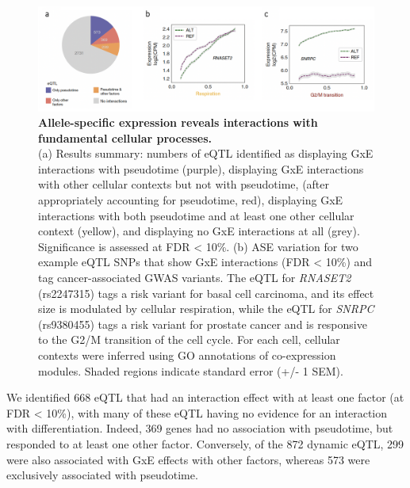 \begin{figure}[h]
\centering
\includegraphics[width=15.5cm]{Chapter4/Fig/endodiff_GxE.png}
\caption[Allele-specific expression reveals interactions with fundamental cellular processes]{\textbf{Allele-specific expression reveals interactions with fundamental cellular processes.}\\
(a) Results summary: numbers of eQTL identified as displaying GxE interactions with pseudotime (purple), displaying GxE interactions with other cellular contexts but not with pseudotime, (after appropriately accounting for pseudotime, red), displaying GxE interactions with both pseudotime and at least one other cellular context (yellow), and displaying no GxE interactions at all (grey). 
Significance is assessed at FDR < 10\%.
(b) ASE variation for two example eQTL SNPs that show GxE interactions (FDR < 10\%) and tag cancer-associated GWAS variants. 
The eQTL for \textit{RNASET2} (rs2247315) tags a risk variant for basal cell carcinoma, and its effect size is modulated by cellular respiration, while the eQTL for \textit{SNRPC} (rs9380455) tags a risk variant for prostate cancer and is responsive to the G2/M transition of the cell cycle. 
For each cell, cellular contexts were inferred using GO annotations of co-expression modules. 
Shaded regions indicate standard error (+/- 1 SEM).}
\label{fig:endodiff_gxe}
\end{figure}

We identified 668 eQTL that had an interaction effect with at least one factor (at FDR < 10\%), with many of these eQTL having no evidence for an interaction with differentiation.
Indeed, 369 genes had no association with pseudotime, but responded to at least one other factor. 
Conversely, of the 872 dynamic eQTL, 299 were also associated with GxE effects with other factors, whereas 573 were exclusively associated with pseudotime.\\

